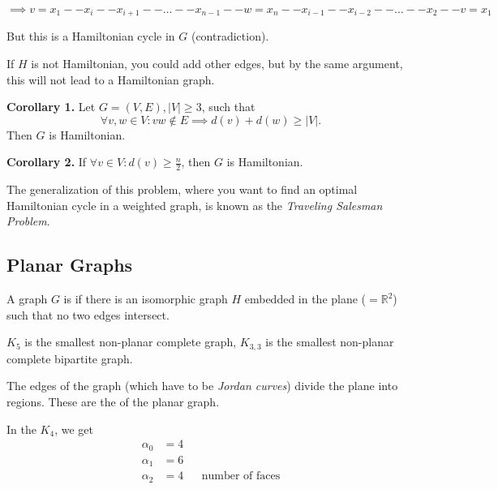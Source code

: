 $\implies v=x_1 -- x_i -- x_{i+1} -- \ldots -- x_{n-1} -- w=x_n -- x_{i-1} -- x_{i-2} -- \ldots -- x_2 -- v=x_1$

But this is a Hamiltonian cycle in $G$ (contradiction).

If $H$ is not Hamiltonian, you could add other edges, but by the same argument, this will not lead to a Hamiltonian graph.

\textbf{Corollary 1.}
Let $G=(V,E), |V| ≥ 3$, such that
\[
    \forall v,w\in V: vw\not\in E\implies d(v) + d(w) \geq |V|.
\]
Then $G$ is Hamiltonian.

\textbf{Corollary 2.}
If 
$\forall v \in V : d(v) \geq \frac{n}{2}$,
then $G$ is Hamiltonian.

The generalization of this problem, where you want to find an optimal Hamiltonian cycle in a weighted graph, is known as the \emph{Traveling Salesman Problem}.


\subsection*{Planar Graphs}

\begin{definition}
A graph $G$ is  if there is an isomorphic graph $H$ embedded in the plane ($= \mathbb{R}^2$) such that no two edges intersect.
\end{definition}

$K_5$ is the smallest non-planar complete graph, $K_{3,3}$ is the smallest non-planar complete bipartite graph.


\begin{definition}
The edges of the graph (which have to be \emph{Jordan curves}) divide the plane into regions. These are the  of the planar graph.
\end{definition}


In the $K_4$, we get
\begin{align*}
    \alpha_0 &= 4 \\
    \alpha_1 &= 6 \\
    \alpha_2 &= 4 &&\text{number of faces}
\end{align*}


